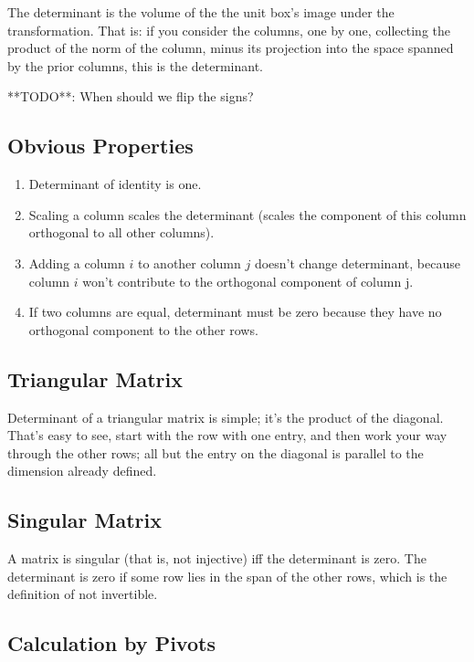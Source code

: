 The determinant is the volume of the the unit box's image under the
transformation. That is: if you consider the columns, one by one,
collecting the product of the norm of the column, minus its projection
into the space spanned by the prior columns, this is the determinant.

**TODO**: When should we flip the signs?

\subsection{Obvious Properties}

\begin{enumerate}
  \item Determinant of identity is one.
  \item Scaling a column scales the determinant (scales the component of
    this column orthogonal to all other columns).
  \item Adding a column $i$ to another column $j$ doesn't change
    determinant, because column $i$ won't contribute to the orthogonal
    component of column j.
  \item If two columns are equal, determinant must be zero because they
    have no orthogonal component to the other rows.
\end{enumerate}

\subsection{Triangular Matrix}

Determinant of a triangular matrix is simple; it's the product of the
diagonal. That's easy to see, start with the row with one entry, and
then work your way through the other rows; all but the entry on the
diagonal is parallel to the dimension already defined.

\subsection{Singular Matrix}

A matrix is singular (that is, not injective) iff the determinant is
zero. The determinant is zero if some row lies in the span of the other
rows, which is the definition of not invertible.

\subsection{Calculation by Pivots}

